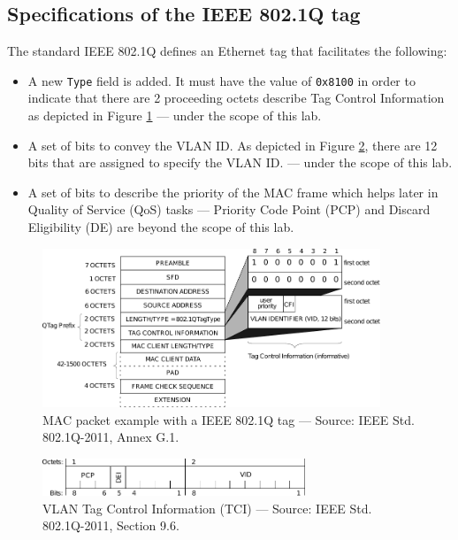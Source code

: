 \documentclass[pdftex,12pt,a4paper]{article}
\begin{document}
        \subsection{Specifications of the IEEE 802.1Q tag}
            The standard IEEE 802.1Q defines an Ethernet tag that facilitates the
            following:
            \begin{itemize}
                \item A new \texttt{Type} field is added. It must have the value of
                    \texttt{0x8100} in order to indicate that there are 2
                    proceeding octets describe Tag Control Information as
                    depicted in Figure \ref{fig:macpacket} --- under the scope
                    of this lab.
                \item A set of bits to convey the VLAN ID. As depicted in Figure
                    \ref{fig:dot1q}, there are 12 bits that are assigned to
                    specify the VLAN ID.  --- under the scope of this lab.
                \item A set of bits to describe the priority of the MAC frame
                    which helps later in Quality of Service (QoS) tasks ---
                    Priority Code Point (PCP) and Discard Eligibility (DE) are
                    beyond the scope of this lab.
            \end{itemize}
            
            \begin{figure}[tbh]
                \centering
                \includegraphics[width=0.9\textwidth]{figures/macpacket}
                \caption{MAC packet example with a IEEE 802.1Q tag --- Source: IEEE Std.
                802.1Q-2011, Annex G.1.}
                \label{fig:macpacket}
            \end{figure}

            \begin{figure}[tbh]
                \centering
                \includegraphics[width=0.7\textwidth]{figures/dot1q}
                \caption{VLAN Tag Control Information (TCI) --- Source: IEEE Std.
                802.1Q-2011, Section 9.6.}
                \label{fig:dot1q}
            \end{figure}
\end{document}
